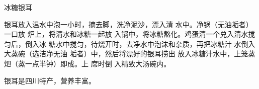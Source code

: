 \begin{recipe}{冰糖银耳}

\ingredients


\preparation

银耳放入温水中泡一小时，摘去脚，洗净泥沙，漂入清 水中。净锅（无油垢者）一口放
炉上，将清水和冰糖一起放 入锅中，将冰糖熬化。鸡蛋清一个兑入清水搅匀后，倒入冰
糖水中搅匀，待烧开时，去净水中泡沫和杂质，再把冰糖汁 水倒入大蒸碗（选洁净无油
垢者）中，然后将漂好的银耳捞出 放入冰糖汁水中，上笼蒸𤆵（蒸一点半钟）即成。上
席时倒 入精致大汤碗内。

\features

银耳是四川特产，营养丰富。

\end{recipe}


